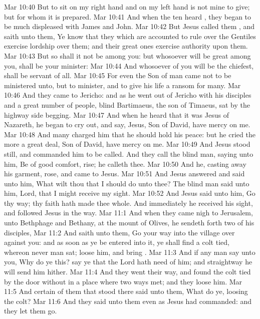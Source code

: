 \vs Mar 10:40 But to sit on my right hand and on my left hand is not mine to give; but  for whom it is prepared.
\vs Mar 10:41 And when the ten heard , they began to be much displeased with James and John.
\vs Mar 10:42 But Jesus called them , and saith unto them, Ye know that they which are accounted to rule over the Gentiles exercise lordship over them; and their great ones exercise authority upon them.
\vs Mar 10:43 But so shall it not be among you: but whosoever will be great among you, shall be your minister:
\vs Mar 10:44 And whosoever of you will be the chiefest, shall be servant of all.
\vs Mar 10:45 For even the Son of man came not to be ministered unto, but to minister, and to give his life a ransom for many.
\vs Mar 10:46 And they came to Jericho: and as he went out of Jericho with his disciples and a great number of people, blind Bartimaeus, the son of Timaeus, sat by the highway side begging.
\vs Mar 10:47 And when he heard that it was Jesus of Nazareth, he began to cry out, and say, Jesus,  Son of David, have mercy on me.
\vs Mar 10:48 And many charged him that he should hold his peace: but he cried the more a great deal,  Son of David, have mercy on me.
\vs Mar 10:49 And Jesus stood still, and commanded him to be called. And they call the blind man, saying unto him, Be of good comfort, rise; he calleth thee.
\vs Mar 10:50 And he, casting away his garment, rose, and came to Jesus.
\vs Mar 10:51 And Jesus answered and said unto him, What wilt thou that I should do unto thee? The blind man said unto him, Lord, that I might receive my sight.
\vs Mar 10:52 And Jesus said unto him, Go thy way; thy faith hath made thee whole. And immediately he received his sight, and followed Jesus in the way.
\vs Mar 11:1 And when they came nigh to Jerusalem, unto Bethphage and Bethany, at the mount of Olives, he sendeth forth two of his disciples,
\vs Mar 11:2 And saith unto them, Go your way into the village over against you: and as soon as ye be entered into it, ye shall find a colt tied, whereon never man sat; loose him, and bring .
\vs Mar 11:3 And if any man say unto you, Why do ye this? say ye that the Lord hath need of him; and straightway he will send him hither.
\vs Mar 11:4 And they went their way, and found the colt tied by the door without in a place where two ways met; and they loose him.
\vs Mar 11:5 And certain of them that stood there said unto them, What do ye, loosing the colt?
\vs Mar 11:6 And they said unto them even as Jesus had commanded: and they let them go.
